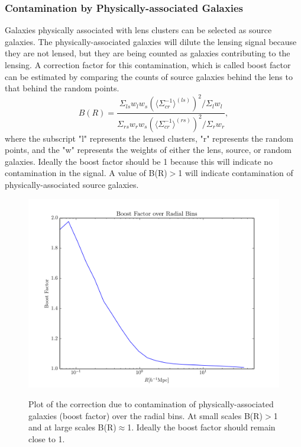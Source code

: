 \documentclass[iop]{emulateapj}
\begin{document}
\subsubsection{Contamination by Physically-associated Galaxies}
	Galaxies physically associated with lens clusters can be selected as source galaxies. The physically-associated galaxies will dilute the lensing signal because they are not lensed, but they are being counted as galaxies contributing to the lensing.  A correction factor for this contamination, which is called boost factor can be estimated by comparing the counts of source galaxies behind the lens to that behind the random points.
	\begin{equation}
		B(R) = \frac{\Sigma_{ls} w_l w_s (\langle \Sigma_{cr}^{-1} \rangle^{(ls)})^2 / \Sigma_l w_l} {\Sigma_{rs} w_r w_s(\langle \Sigma_{cr}^{-1} \rangle^{(rs)})^2 / \Sigma_r w_r},
	\end{equation}
where the subscript "l" represents the lensed clusters, "r" represents the random points, and the "w" represents the weights of either the lens, source, or random galaxies. Ideally the boost factor should be 1 because this will indicate no contamination in the signal. A value of B(R)$>$1 will indicate contamination of physically-associated source galaxies. 
	\begin{figure}
		\includegraphics[width = \linewidth]{Boost_Factor}
		\label{fig:BoostFactor}
		\caption{Plot of the correction due to contamination of physically-associated galaxies (boost factor) over the radial bins. At small scales B(R)$>$1 and at large scales B(R)$\approx$1. Ideally the boost factor should remain close to 1. }
	\end{figure}
	
\end{document}
